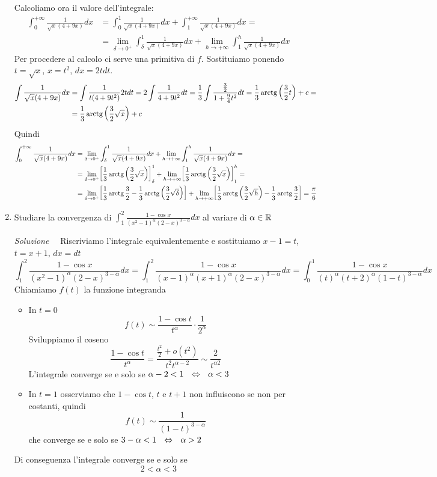\documentclass{article}
\begin{document}
\begin{enumerate}[label=\textbf{Esercizio 11.\arabic*.},itemindent=*]
Calcoliamo ora il valore dell'integrale:
\[\begin{aligned}\int_0^{+\infty}\frac{1}{\sqrt{x}(4+9x)}dx&=\int_0^1\frac{1}{\sqrt{x}(4+9x)}dx+\int_1^{+\infty}\frac{1}{\sqrt{x}(4+9x)}dx=\\&=\lim_{\delta\to {0^+}}\int_\delta^1\frac{1}{\sqrt{x}(4+9x)}dx+\lim_{h\to {+\infty}}\int_1^{h}\frac{1}{\sqrt{x}(4+9x)}dx\end{aligned}\]
Per procedere al calcolo ci serve una primitiva di $f$. Sostituiamo ponendo $t=\sqrt{x}$, $x=t^2$, $dx=2tdt$.
\[\begin{aligned}
    \int\frac{1}{\sqrt{x}(4+9x)}dx&=\int\frac{1}{t(4+9t^2)}2tdt=2\int\frac{1}{4+9t^2}dt=\frac{1}{3}\int\frac{\frac{3}{2}}{1+\frac{9}{4}t^2}dt=\frac{1}{3}\operatorname{arctg}\left(\frac{3}{2}t\right)+c=\\&=\frac{1}{3}\operatorname{arctg}\left(\frac{3}{2}\sqrt{x}\right)+c
\end{aligned}\]
Quindi 
\[\begin{aligned}
    \int_0^{+\infty}\frac{1}{\sqrt{x}(4+9x)}dx&=
    \lim_{\delta\to {0^+}}\int_\delta^1\frac{1}{\sqrt{x}(4+9x)}dx+\lim_{h\to {+\infty}}\int_1^{h}\frac{1}{\sqrt{x}(4+9x)}dx=\\&=
    \lim_{\delta\to {0^+}}\biggl[\frac{1}{3}\operatorname{arctg}\left( \frac{3}{2} \sqrt{x}\right)\biggr]_\delta^1+\lim_{h\to {+\infty}}\biggl[\frac{1}{3}\operatorname{arctg}\left( \frac{3}{2} \sqrt{x}\right)\biggr]_1^{h}=\\&=
    \lim_{\delta\to {0^+}}\biggl[\frac{1}{3}\operatorname{arctg}\frac{3}{2}-\frac{1}{3}\operatorname{arctg}\left( \frac{3}{2} \sqrt{\delta}\right)\biggr]+\lim_{h\to {+\infty}}\biggl[\frac{1}{3}\operatorname{arctg}\left( \frac{3}{2} \sqrt{h}\right)-\frac{1}{3}\operatorname{arctg}\frac{3}{2}\biggr]=\frac{\pi}{6}
\end{aligned}\]

\item Studiare la convergenza di $\int_1^2\frac{1-\cos x}{(x^2-1)^\alpha(2-x)^{3-\alpha}}dx$ al variare di $\alpha \in \mathbb{R}$
\item[\textit{\large Soluzione~}]~Riscriviamo l'integrale equivalentemente e sostituiamo $x-1=t$, $t=x+1$, $dx=dt$
\[\int_1^2\frac{1-\cos x}{(x^2-1)^\alpha(2-x)^{3-\alpha}}dx=\int_1^2\frac{1-\cos x}{(x-1)^\alpha(x+1)^\alpha(2-x)^{3-\alpha}}dx=\int_0^1\frac{1-\cos x}{(t)^\alpha(t+2)^\alpha(1-t)^{3-\alpha}}dx\]
Chiamiamo $f(t)$ la funzione integranda
\begin{itemize}
    \item In $t=0$
    \[f(t)\sim\frac{1-\cos t}{t^\alpha}\cdot\frac{1}{2^\alpha}\]
    Sviluppiamo il coseno
    \[\frac{1-\cos t}{t^\alpha}=\frac{\frac{t^2}{2}+o(t^2)}{t^2t^{\alpha-2}}\sim \frac{2}{t^{\alpha2}}\]
    L'integrale converge se e solo se $\alpha-2<1~~\Leftrightarrow~~\alpha<3$
    \item In $t=1$ osserviamo che $1-\cos t$, $t$ e $t+1$ non influiscono se non per costanti, quindi 
    \[f(t)\sim \frac{1}{(1-t)^{3-\alpha}}\]
    che converge se e solo se $3-\alpha <1~~\Leftrightarrow~~\alpha>2$
\end{itemize}
Di conseguenza l'integrale converge se e solo se 
\[2<\alpha<3\]


\end{enumerate}
\end{document}
